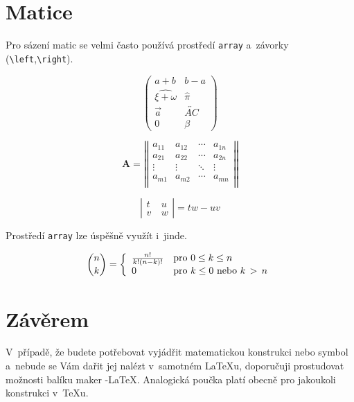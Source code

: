 \documentclass[11pt,twocolumn,a4paper]{article}
\theoremstyle{definition}
\theoremstyle{plain}
\begin{document}
\section{Matice}

Pro sázení matic se velmi často používá prostředí \texttt{array} a~závorky (\verb|\left|,\verb|\right|). 

\[ \left( \begin{array}{cc}
a+b & b-a\\
\widehat{\xi+\omega} & \hat{\pi}\\
\vec{a} & \overleftrightarrow{AC}\\
0 & \beta
\end{array} \right) \]

\[ \textbf{A} =  \left|\left| \begin{array}{cccc}
a_{11} & a_{12} & \cdots & a_{1n}\\
a_{21} & a_{22} & \cdots & a_{2n}\\
\vdots & \vdots & \ddots & \vdots\\
a_{m1} & a_{m2} & \cdots & a_{mn}\\
\end{array} \right|\right| \]

\[ \left| \begin{array}{cc}
t & u\\
v~& w
\end{array} \right| = tw - uv \]

Prostředí \texttt{array} lze úspěšně využít i~jinde.

$$ \binom{n}{k} = \left\{
\begin{array}{l l}
\frac{n!}{k!(n-k)!} & \text{pro } 0\leq k\leq n \\
0 & \text{pro } k\leq 0 \text{ nebo } k\,>\,n
\end{array} \right. $$

\section{Závěrem}

V~případě, že budete potřebovat vyjádřit matematickou konstrukci nebo symbol a~nebude se Vám dařit jej nalézt v~samotném \LaTeX u, doporučuji prostudovat možnosti ba\-líku maker \AmS-\LaTeX .
Analogická poučka platí obec\-ně pro jakoukoli konstrukci v~\TeX u.
\end{document}
